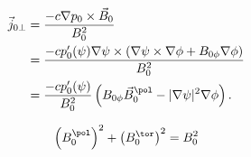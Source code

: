 \begin{align}
  \vec{j}_{0 \perp} &= \frac{-c \nabla p_{0} \times \vec{B}_{0}}{B_{0}^{2}} \\
  &= \frac{-c p_{0}' (\psi) \nabla \psi \times (\nabla \psi \times \nabla \phi + B_{0 \phi} \nabla \phi)}{B_{0}^{2}} \nonumber \\
  &= \frac{-c p_{0}' (\psi)}{B_{0}^{2}} \left( B_{0 \phi} \vec{B}_{0}^{\pol} - \lvert \nabla \psi \rvert^{2} \nabla \phi \right).
\end{align}

\begin{gather}
  \left( B_{0}^{\pol} \right)^{2} + \left( B_{0}^{\tor} \right)^{2} = B_{0}^{2}
\end{gather}

\usepackage[
  xindy,
  numberedsection,
  toc,
  nonumberlist,
  nopostdot
]{glossaries}
\usepackage{glossary-longbooktabs}
\makeglossaries
\AfterPreamble{%
  
}
